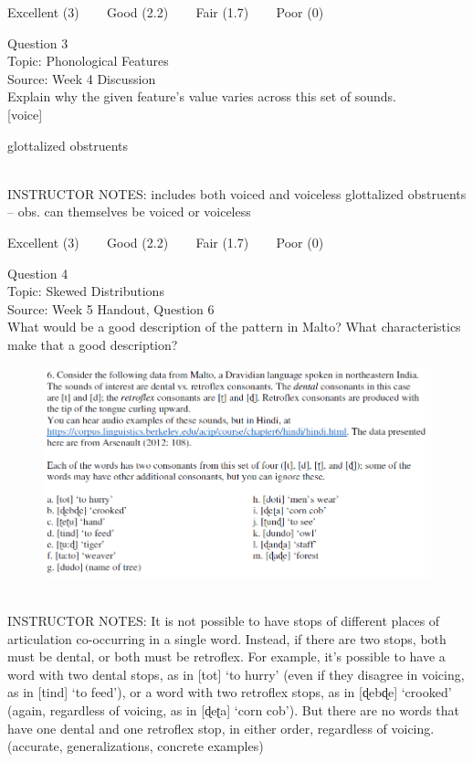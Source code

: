 \documentclass[12pt]{article}
\begin{document}
\vfill
Excellent (3) ~~~ Good (2.2) ~~~ Fair (1.7) ~~~ Poor (0)
\newpage

{\large Question 3}\\

Topic: Phonological Features\\
Source: Week 4 Discussion\\

Explain why the given feature's value varies across this set of sounds.\\

{[voice]}

glottalized obstruents


~\\
INSTRUCTOR NOTES: includes both voiced and voiceless glottalized obstruents -- obs. can themselves be voiced or voiceless


\vfill
Excellent (3) ~~~ Good (2.2) ~~~ Fair (1.7) ~~~ Poor (0)
\newpage

{\large Question 4}\\

Topic: Skewed Distributions\\
Source: Week 5 Handout, Question 6\\

What would be a good description of the pattern in Malto? What characteristics make that a good description?\\

\begin{figure}[H]
\includegraphics{../images/malto.png}
\end{figure}

~\\
INSTRUCTOR NOTES: It is not possible to have stops of different places of articulation co-occurring in a single word. Instead, if there are two stops, both must be dental, or both must be retroflex. For example, it’s possible to have a word with two dental stops, as in [tot] ‘to hurry’ (even if they disagree in voicing, as in [tind] ‘to feed’), or a word with two retroflex stops, as in [ɖebɖe] ‘crooked’ (again, regardless of voicing, as in [ɖeʈa] ‘corn cob’). But there are no words that have one dental and one retroflex stop, in either order, regardless of voicing. (accurate, generalizations, concrete examples)
\end{document}

